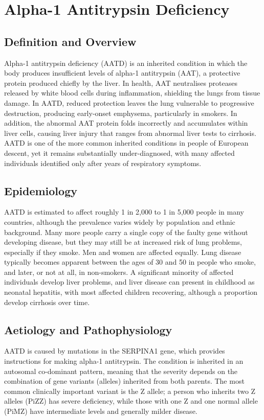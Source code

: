 \chapter{Alpha-1 Antitrypsin Deficiency}

\section*{Definition and Overview}
Alpha-1 antitrypsin deficiency (AATD) is an inherited condition in which the body produces insufficient levels of alpha-1 antitrypsin (AAT), a protective protein produced chiefly by the liver. In health, AAT neutralises proteases released by white blood cells during inflammation, shielding the lungs from tissue damage. In AATD, reduced protection leaves the lung vulnerable to progressive destruction, producing early-onset emphysema, particularly in smokers. In addition, the abnormal AAT protein folds incorrectly and accumulates within liver cells, causing liver injury that ranges from abnormal liver tests to cirrhosis. AATD is one of the more common inherited conditions in people of European descent, yet it remains substantially under-diagnosed, with many affected individuals identified only after years of respiratory symptoms.

\section*{Epidemiology}
AATD is estimated to affect roughly 1 in 2,000 to 1 in 5,000 people in many countries, although the prevalence varies widely by population and ethnic background. Many more people carry a single copy of the faulty gene without developing disease, but they may still be at increased risk of lung problems, especially if they smoke. Men and women are affected equally. Lung disease typically becomes apparent between the ages of 30 and 50 in people who smoke, and later, or not at all, in non-smokers. A significant minority of affected individuals develop liver problems, and liver disease can present in childhood as neonatal hepatitis, with most affected children recovering, although a proportion develop cirrhosis over time.

\section*{Aetiology and Pathophysiology}
AATD is caused by mutations in the SERPINA1 gene, which provides instructions for making alpha-1 antitrypsin. The condition is inherited in an autosomal co-dominant pattern, meaning that the severity depends on the combination of gene variants (alleles) inherited from both parents. The most common clinically important variant is the Z allele; a person who inherits two Z alleles (PiZZ) has severe deficiency, while those with one Z and one normal allele (PiMZ) have intermediate levels and generally milder disease.

